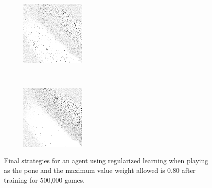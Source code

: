 \begin{figure}
\begin{subfigure}[t]{0.22\textwidth}
		\caption{\peggingmaxavggained}
	\end{subfigure}
~
	\begin{subfigure}[t]{0.22\textwidth}
		\center
		\includegraphics[width=\textwidth]{images/findings/experiments/regularization/strats/0.80/pegging_max_med_gained.png}
		\caption{\peggingmaxmedgained}
	\end{subfigure}
	~
	\begin{subfigure}[t]{0.22\textwidth}
		\center
		\includegraphics[width=\textwidth]{images/findings/experiments/regularization/strats/0.80/pegging_min_avg_given.png}
		\caption{\peggingminavggiven}
	\end{subfigure}

\caption{
	Final strategies for an agent using regularized learning
	when playing as the pone
	and the maximum value weight allowed is 0.80
	after training for 500,000 games.
}
\label{fig:reg-strats-0.80}
\end{figure}
